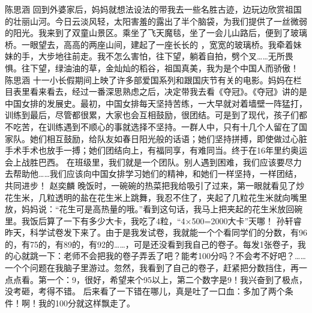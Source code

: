 {}\markdownRendererInterblockSeparator
{}陈思涵\markdownRendererInterblockSeparator
{}回到外婆家后，妈妈就想法设法的带我去一些名胜古迹，边玩边欣赏祖国的壮丽山河。今日云淡风轻，太阳害羞的露出了半个脑袋，为我们提供了一丝微弱的阳光。我来到了双童山景区。乘坐了飞天魔毯，坐了一会儿山路后，便到了玻璃桥。一眼望去，高高的两座山间，建起了一座长长的 ，宽宽的玻璃桥。我牵着妹妹的手，大步地往前走。我不怎么害怕，往下望，躺着自拍，劈个叉……无所畏惧。往下望，绿油油的草，金灿灿的稻谷，祖国真美，我为是个中国人而骄傲！\markdownRendererInterblockSeparator
{}\markdownRendererInterblockSeparator
{}陈思涵\markdownRendererInterblockSeparator
{}十一小长假期间上映了许多部爱国系列和跟国庆节有关的电影。妈妈在栏目表里看来看去，经过一番深思熟虑之后，决定带我去看《夺冠》。《夺冠》讲的是中国女排的发展史。最初，中国女排每天坚持苦练，一大早就对着墙壁一阵猛打，训练到最后，尽管都很累，大家也会互相鼓励，很团结。可是到了现代，孩子们都不吃苦，在训练遇到不顺心的事就选择不坚持。一群人中，只有十几个人留在了国家队。她们相互鼓励，给队友如春日阳光般的话语；她们坚持拼搏，即使做过心脏手术手术也放手一搏；她们团结向上，有福同享，有难同当。终于在16年里约奥运会上战胜巴西。\markdownRendererInterblockSeparator
{}在班级里，我们就是一个团队。别人遇到困难，我们应该要尽力去帮助他……我们应该向中国女排学习她们的精神，和她们一样坚持，一样团结，共同进步！\markdownRendererInterblockSeparator
{}\markdownRendererInterblockSeparator
{}赵奕麟\markdownRendererInterblockSeparator
{}晚饭时，一碗碗的热菜把我给吸引了过来，第一眼就看见了炒花生米，几粒透明的盐在花生米上跳舞，我忍不住了，夹起了几粒花生米就向嘴里放，妈妈说：“花生可是高热量的哦。”看到这句话，我马上把夹起的花生米放回碗里。我饭后算了一下有多少大卡，我吃了4粒，“4×500=2000大卡”天哪！\markdownRendererInterblockSeparator
{}\markdownRendererInterblockSeparator
{}孙轩睿\markdownRendererInterblockSeparator
{}昨天，科学试卷发下来了。由于是我发试卷，我就能一个个看同学们的分数，有96的，有75的，有89的，有92的……，可是还没看到我自己的卷子。每发1张卷子，我的心就跳一下：老师不会把我的卷子弄丢了吧？能考100分吗？不会考不好吧？……一个个问题在我脑子里游过。忽然，我看到了自己的卷子，赶紧把分数挡住，再一点点看。第一个：9，很好，希望来个95以上，第二个数字是9！我兴奋到了极点，没考砸，考得不错。\markdownRendererInterblockSeparator
{}后来看了一下错在哪儿，真是吐了一口血：多加了两个条件！啊！我的100分就这样飘走了。\markdownRendererInterblockSeparator
{}\markdownRendererInterblockSeparator
